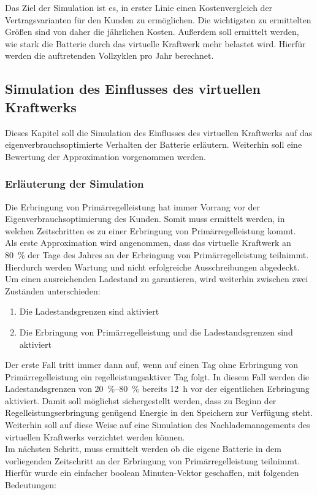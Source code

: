 \noindent Das Ziel der Simulation ist es, in erster Linie einen Kostenvergleich der Vertragsvarianten für den Kunden zu ermöglichen. Die wichtigsten zu ermittelten Größen sind von daher die jährlichen Kosten. Außerdem soll ermittelt werden, wie stark die Batterie durch das virtuelle Kraftwerk mehr belastet wird. Hierfür werden die auftretenden Vollzyklen pro Jahr berechnet.

\subsection{Simulation des Einflusses des virtuellen Kraftwerks}

Dieses Kapitel soll die Simulation des Einflusses des virtuellen Kraftwerks auf das eigenverbrauchsoptimierte Verhalten der Batterie erläutern. Weiterhin soll eine Bewertung der Approximation vorgenommen werden.

\subsubsection{Erläuterung der Simulation}

Die Erbringung von Primärregelleistung hat immer Vorrang vor der Eigenverbrauchsoptimierung des Kunden. Somit muss ermittelt werden, in welchen Zeitschritten es zu einer Erbringung von Primärregelleistung kommt.\medskip\\
Als erste Approximation wird angenommen, dass das virtuelle Kraftwerk an \SI{80}{\percent} der Tage des Jahres an der Erbringung von Primärregelleistung teilnimmt. Hierdurch werden Wartung und nicht erfolgreiche Ausschreibungen abgedeckt. Um einen ausreichenden Ladestand zu garantieren, wird weiterhin zwischen zwei Zuständen unterschieden:

\begin{enumerate}
\itemsep-0.5em
	\item Die Ladestandsgrenzen sind aktiviert
	\item Die Erbringung von Primärregelleistung und die Ladestandsgrenzen sind aktiviert
\end{enumerate}

\noindent Der erste Fall tritt immer dann auf, wenn auf einen Tag ohne Erbringung von Primärregelleistung ein regelleistungsaktiver Tag folgt. In diesem Fall werden die Ladestandsgrenzen von \SIrange{20}{80}{\percent} bereits \SI{12}{\hour} vor der eigentlichen Erbringung aktiviert. Damit soll möglichst sichergestellt werden, dass zu Beginn der Regelleistungserbringung genügend Energie in den Speichern zur Verfügung steht. Weiterhin soll auf diese Weise auf eine Simulation des Nachlademanagements des virtuellen Kraftwerks verzichtet werden können.\medskip\\
Im nächsten Schritt, muss ermittelt werden ob die eigene Batterie in dem vorliegenden Zeitschritt an der Erbringung von Primärregelleistung teilnimmt. Hierfür wurde ein einfacher boolean Minuten-Vektor geschaffen, mit folgenden Bedeutungen:

